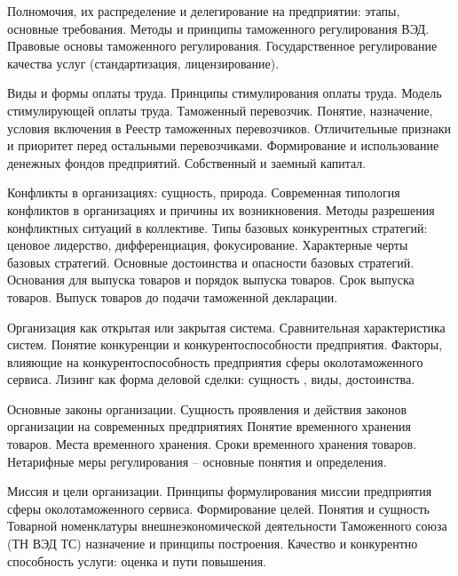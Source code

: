 \documentclass[
	11pt,
	a4paper,
	]
	{article}
\begin{document}
\noindent{} 
	{
		Полномочия, их распределение и делегирование на предприятии: этапы, основные требования.
	}{
		Методы и принципы таможенного регулирования ВЭД. Правовые основы таможенного регулирования.
	}{
		Государственное регулирование качества услуг (стандартизация, лицензирование).
	}

\bigskip

\noindent{} 
	{
		Виды и формы оплаты труда. Принципы стимулирования оплаты труда. Модель стимулирующей оплаты труда.
	}{
		Таможенный перевозчик. Понятие, назначение, условия включения в Реестр таможенных перевозчиков. Отличительные признаки и приоритет перед остальными перевозчиками.
	}{
		Формирование и использование денежных фондов предприятий. Собственный и заемный капитал.
	}

\bigskip

\noindent{} 
	{
		Конфликты в организациях: сущность, природа. Современная типология конфликтов в организациях и причины их возникновения. Методы разрешения конфликтных ситуаций в коллективе.
	}{
		Типы базовых конкурентных стратегий: ценовое лидерство, дифференциация, фокусирование. Характерные черты базовых стратегий. Основные достоинства и опасности базовых стратегий.
	}{
		Основания для выпуска товаров и порядок выпуска товаров. Срок выпуска товаров. Выпуск товаров до подачи таможенной декларации.
	}

\bigskip

\noindent{} 
	{
		Организация как открытая или закрытая система. Сравнительная характеристика систем.
	}{
		Понятие конкуренции и конкурентоспособности предприятия. Факторы, влияющие на конкурентоспособность предприятия сферы околотаможенного сервиса.
	}{
		Лизинг как форма деловой сделки: сущность , виды, достоинства.
	}

\bigskip

\noindent{} 
	{
		Основные законы организации. Сущность проявления и действия законов организации на современных предприятиях
	}{
		Понятие временного хранения товаров. Места временного хранения. Сроки временного хранения товаров.
	}{
		Нетарифные меры регулирования – основные понятия и определения.
	}

\bigskip

\noindent{} 
	{
		Миссия и цели организации. Принципы формулирования миссии предприятия сферы околотаможенного сервиса. Формирование целей.
	}{
		Понятия и сущность Товарной номенклатуры внешнеэкономической деятельности Таможенного союза (ТН ВЭД ТС) назначение и принципы построения.
	}{
		Качество и конкурентно способность услуги: оценка и пути повышения.
	}
\end{document}
